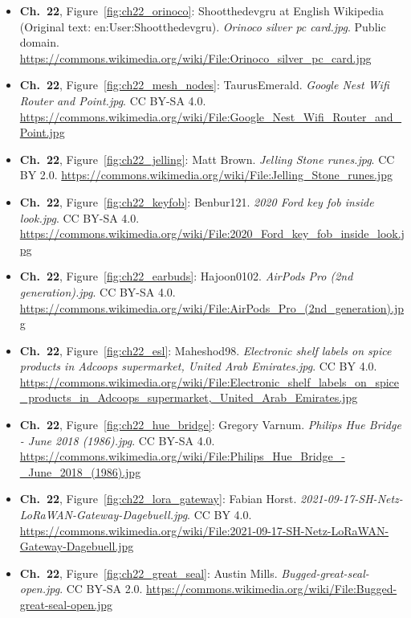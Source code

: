 \begin{small}
\begin{itemize}[leftmargin=0pt,itemsep=2pt,label={}]
\item \textbf{Ch.~22}, Figure~\ref{fig:ch22_orinoco}: Shootthedevgru at English Wikipedia (Original text: en:User:Shootthedevgru). \emph{Orinoco silver pc card.\allowbreak{}jpg}. Public domain. \url{https://commons.wikimedia.org/wiki/File:Orinoco_silver_pc_card.jpg}
\item \textbf{Ch.~22}, Figure~\ref{fig:ch22_mesh_nodes}: TaurusEmerald. \emph{Google Nest Wifi Router and Point.\allowbreak{}jpg}. CC BY-SA 4.0. \url{https://commons.wikimedia.org/wiki/File:Google_Nest_Wifi_Router_and_Point.jpg}
\item \textbf{Ch.~22}, Figure~\ref{fig:ch22_jelling}: Matt Brown. \emph{Jelling Stone runes.\allowbreak{}jpg}. CC BY 2.0. \url{https://commons.wikimedia.org/wiki/File:Jelling_Stone_runes.jpg}
\item \textbf{Ch.~22}, Figure~\ref{fig:ch22_keyfob}: Benbur121. \emph{2020 Ford key fob inside look.\allowbreak{}jpg}. CC BY-SA 4.0. \url{https://commons.wikimedia.org/wiki/File:2020_Ford_key_fob_inside_look.jpg}
\item \textbf{Ch.~22}, Figure~\ref{fig:ch22_earbuds}: Hajoon0102. \emph{AirPods Pro (2nd generation).\allowbreak{}jpg}. CC BY-SA 4.0. \url{https://commons.wikimedia.org/wiki/File:AirPods_Pro_(2nd_generation).jpg}
\item \textbf{Ch.~22}, Figure~\ref{fig:ch22_esl}: Maheshod98. \emph{Electronic shelf labels on spice products in Adcoops supermarket, United Arab Emirates.\allowbreak{}jpg}. CC BY 4.0. \url{https://commons.wikimedia.org/wiki/File:Electronic_shelf_labels_on_spice_products_in_Adcoops_supermarket,_United_Arab_Emirates.jpg}
\item \textbf{Ch.~22}, Figure~\ref{fig:ch22_hue_bridge}: Gregory Varnum. \emph{Philips Hue Bridge -\allowbreak{} June 2018 (1986).\allowbreak{}jpg}. CC BY-SA 4.0. \url{https://commons.wikimedia.org/wiki/File:Philips_Hue_Bridge_-_June_2018_(1986).jpg}
\item \textbf{Ch.~22}, Figure~\ref{fig:ch22_lora_gateway}: Fabian Horst. \emph{2021-\allowbreak{}09-\allowbreak{}17-\allowbreak{}SH-\allowbreak{}Netz-\allowbreak{}LoRaWAN-\allowbreak{}Gateway-\allowbreak{}Dagebuell.\allowbreak{}jpg}. CC BY 4.0. \url{https://commons.wikimedia.org/wiki/File:2021-09-17-SH-Netz-LoRaWAN-Gateway-Dagebuell.jpg}
\item \textbf{Ch.~22}, Figure~\ref{fig:ch22_great_seal}: Austin Mills. \emph{Bugged-\allowbreak{}great-\allowbreak{}seal-\allowbreak{}open.\allowbreak{}jpg}. CC BY-SA 2.0. \url{https://commons.wikimedia.org/wiki/File:Bugged-great-seal-open.jpg}

\end{itemize}
\end{small}
